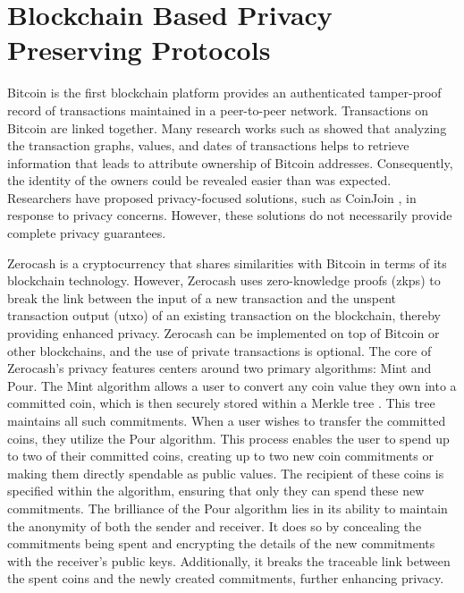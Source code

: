 
\section{Blockchain Based Privacy Preserving Protocols} \label{sec:lit_Blockchain_based_preserving_protocols}

Bitcoin \cite{nakamoto2008bitcoin} is the first blockchain platform provides an authenticated tamper-proof record of transactions maintained in a peer-to-peer network. Transactions on Bitcoin are linked together. Many research works such as \cite{Reid2013, Ron2013, Meiklejohn2016} showed that analyzing the transaction graphs, values, and dates of transactions helps to retrieve information that leads to attribute ownership of Bitcoin addresses. Consequently, the identity of the owners could be revealed easier than was expected. Researchers have proposed privacy-focused solutions, such as CoinJoin \cite{coinjoin}, in response to privacy concerns. However, these solutions do not necessarily provide complete privacy guarantees.

Zerocash \cite{zcash-proc} is a cryptocurrency that shares similarities with Bitcoin in terms of its blockchain technology. However, Zerocash uses zero-knowledge proofs (\glspl{zkp}) to break the link between the input of a new transaction and the unspent transaction output (\gls{utxo}) of an existing transaction on the blockchain, thereby providing enhanced privacy. Zerocash can be implemented on top of Bitcoin or other blockchains, and the use of private transactions is optional.
The core of Zerocash's privacy features centers around two primary algorithms: \textsf{Mint} and \textsf{Pour}. The \textsf{Mint} algorithm allows a user to convert any coin value they own into a committed coin, which is then securely stored within a Merkle tree \cite{Merkle1980}. This tree maintains all such commitments. When a user wishes to transfer the committed coins, they utilize the \textsf{Pour} algorithm. This process enables the user to spend up to two of their committed coins, creating up to two new coin commitments or making them directly spendable as public values. The recipient of these coins is specified within the algorithm, ensuring that only they can spend these new commitments. The brilliance of the \textsf{Pour} algorithm lies in its ability to maintain the anonymity of both the sender and receiver. It does so by concealing the commitments being spent and encrypting the details of the new commitments with the receiver's public keys. Additionally, it breaks the traceable link between the spent coins and the newly created commitments, further enhancing privacy.



